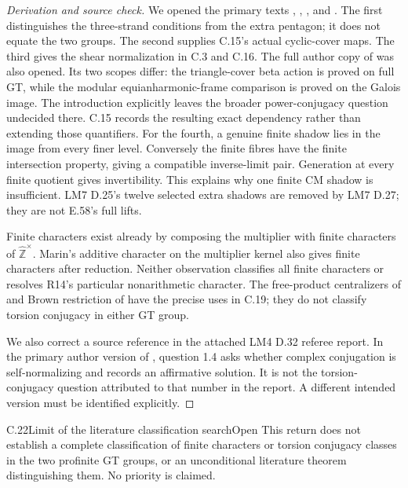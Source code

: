 \begin{proof}[Derivation and source check]
We opened the primary texts
\citep[Main Theorem, \S0.1]{cHarbaterSchneps2000},
\citep[Theorem 8.1]{cEnriquez2007},
\citep[\S4]{cMarin2008}, and
\citep[Theorem 5.2, Corollary 5.4,
Proposition 5.5]{cDolgushevGuynee2024}.
The first distinguishes the
three-strand conditions from
the extra pentagon; it does
not equate the two groups.
The second supplies C.15's
actual cyclic-cover maps.
The third gives the shear
normalization in C.3 and C.16.
The full author copy of
\citet[Propositions 4.4, 4.13 and Theorem 4.16]{cNakamuraTsunogaiYasuda2010}
was also opened. Its two scopes differ:
the triangle-cover beta action is proved on full GT,
while the modular equianharmonic-frame comparison
is proved on the Galois image. The introduction
explicitly leaves the broader power-conjugacy question
undecided there. C.15 records the resulting exact
dependency rather than extending those quantifiers.
For the fourth, a genuine
finite shadow lies in the
image from every finer level.
Conversely the finite fibres
have the finite intersection
property, giving a compatible
inverse-limit pair. Generation
at every finite quotient gives
invertibility. This explains
why one finite CM shadow is
insufficient. LM7 D.25's
twelve selected extra shadows
are removed by LM7 D.27;
they are not E.58's full lifts.

Finite characters exist already
by composing the multiplier with
finite characters of
\(\widehat{\mathbb Z}^{\times}\).
Marin's additive character on
the multiplier kernel also
gives finite characters after
reduction. Neither observation
classifies all finite characters
or resolves R14's particular
nonarithmetic character.
The free-product centralizers
of \citet{cHerfortRibes1985}
and Brown restriction of
\citet{cKochloukovaZalesskii2007}
have the precise uses in C.19;
they do not classify torsion
conjugacy in either GT group.

We also correct a source
reference in the attached
LM4 D.32 referee report.
In the primary author version
of \citet{cLochakSchneps2006},
question 1.4 asks whether
complex conjugation is
self-normalizing and records
an affirmative solution.
It is not the torsion-conjugacy
question attributed to that
number in the report.
A different intended version
must be identified explicitly.
\end{proof}

\begin{statement}{C.22}{Limit of the literature classification search}{Open}
This return does not establish a
complete classification of finite
characters or torsion conjugacy
classes in the two profinite GT
groups, or an unconditional
literature theorem distinguishing
them. No priority is claimed.
\end{statement}


